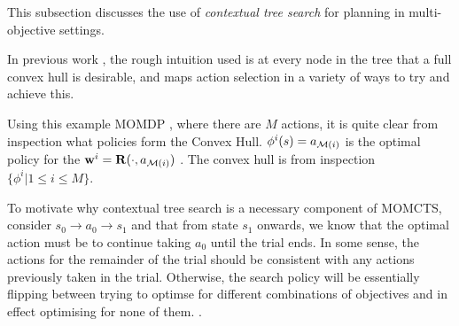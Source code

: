 








        This subsection discusses the use of \textit{contextual tree search} for planning in multi-objective settings. 
    
    
        In previous work , the rough intuition used is at every node in the tree that a full convex hull is desirable, and maps action selection in a variety of ways to try and achieve this.
    
        Using this example MOMDP , where there are $M$ actions, it is quite clear from inspection what policies form the Convex Hull. $\phi^i(s)=a_{\mathcal{M}(i)}$ is the optimal policy for the  $\mathbf{w}^i=\mathbf{R}(\cdot,a_{\mathcal{M}(i)})$ . The convex hull is from inspection $\{\phi^i | 1\leq i \leq M\}$. 
    
    
        To motivate why contextual tree search is a necessary component of MOMCTS, consider $s_0\rightarrow a_0 \rightarrow s_1$  and that from state $s_1$ onwards, we know that the optimal action must be to continue taking $a_0$ until the trial ends. In some sense, the actions for the remainder of the trial should be consistent with any actions previously taken in the trial. Otherwise, the search policy will be essentially flipping between trying to optimse for different combinations of objectives and in effect optimising for none of them. .
        
